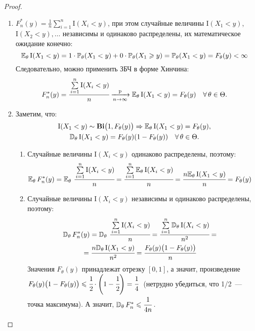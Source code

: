 \begin{proof}\leavevmode
    \begin{enumerate}
        \item 
            $F_{n}^{*}(y)=\frac{1}{n} \sum\limits_{i=1}^{n} \mathrm{I}(X_{i}<y)$, при этом случайные величины $\mathrm{I}(X_{1}<y)$, $\mathrm{I}(X_{2}<y), \ldots$ независимы и одинаково распределены, их математическое ожидание конечно:
            \begin{equation*}
                \mathbb{E}_{\theta}\, \mathrm{I}(X_{1}<y)=1 \cdot \mathbb{P}_{\theta} (X_{1}<y)+0 \cdot \mathbb{P}_{\theta} (X_{1} \geqslant y) = \mathbb{P}_{\theta} (X_{1}<y)=F_{\theta}(y) < \infty
            \end{equation*}
            Следовательно, можно применить ЗБЧ в форме Хинчина:
            \begin{equation*}
                F_{n}^{*}(y)=\cfrac{\sum\limits_{i=1}^{n} \mathrm{I}(X_{i}<y)}{n} \xrightarrow[n \to \infty]{\text{p}} \mathbb{E}_{\theta}\, \mathrm{I}(X_{1}<y)=F_{\theta}(y) \quad \forall \, \theta \in \Theta.
            \end{equation*}
        \item 
            Заметим, что:
            \begin{gather*}
                \mathrm{I}(X_{1}<y) \sim  \mathbf{Bi}\bigl(1, F_{\theta}(y)\bigr) \Rightarrow \mathbb{E}_{\theta}\, \mathrm{I}(X_{1}<y) = F_{\theta}(y), \\
                \mathbb{D}_{\theta}\, \mathrm{I}(X_{1}<y) = F_{\theta}(y)(1-F_{\theta}(y)) \quad \forall \, \theta \in \Theta.
            \end{gather*}
            \begin{enumerate}[label={\arabic*)}]
                \item Случайные величины $\mathrm{I}(X_{i}<y)$ одинаково распределены, поэтому:
                \begin{equation*}
                    \mathbb{E}_{\theta}\, F_{n}^{*}(y) = \mathbb{E}_{\theta}\, \, \cfrac{\sum\limits_{i=1}^{n} \mathrm{I}(X_{i}<y)}{n} =\cfrac{\sum\limits_{i=1}^{n} \mathbb{E}_{\theta}\, \mathrm{I}(X_{i}<y)}{n}=\cfrac{n \mathbb{E}_{\theta}\, \mathrm{I}(X_{1}<y)}{n}=F_{\theta}(y)  
                \end{equation*}
                
                \item Случайные величины $\mathrm{I}(X_{i}<y)$ независимы и одинаково распределены, поэтому:
                \begin{multline*}
                    \mathbb{D}_{\theta}\, F_{n}^{*}(y)
                    = \mathbb{D}_{\theta}\, \, \cfrac{\sum\limits_{i=1}^{n} \mathrm{I}(X_{i}<y)}{n}
                    = \cfrac{\sum\limits_{i=1}^{n} \mathbb{D}_{\theta}\, \mathrm{I}(X_{i}<y)}{n^{2}}
                    = \\
                    = \cfrac{n\mathbb{D}_{\theta}\, \mathrm{I}(X_{1}<y)}{n^{2}}
                    = \cfrac{F_{\theta}(y)\bigl(1-F_{\theta}(y)\bigr)}{n}
                \end{multline*}
                Значения $F_{\theta}(y)$ принадлежат отрезку $[0, 1]$, а значит, произведение $F_{\theta}(y)\bigl(1 - F_{\theta}(y)\bigr) \leqslant \cfrac{1}{2}\cdot\left(1 - \cfrac{1}{2}\right) = \cfrac{1}{4}~$ (нетрудно убедиться, что 1/2~--- точка максимума). 
                А значит, $\mathbb{D}_{\theta}\, F_{n}^{*} \leqslant \cfrac{1}{4n}\,$. 
                

\end{enumerate}
\end{enumerate}
\end{proof}
